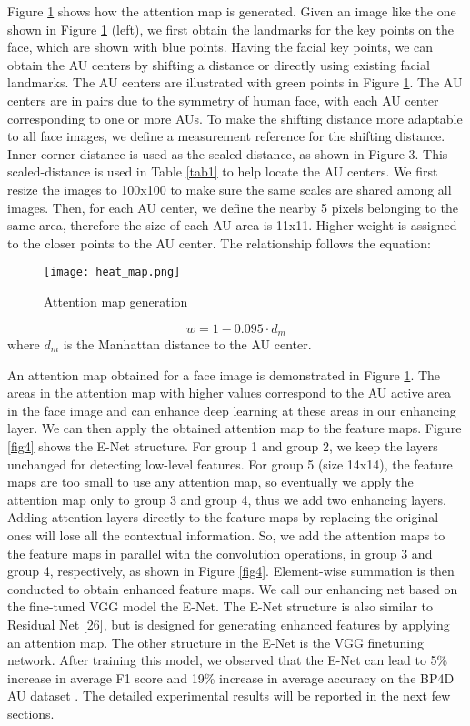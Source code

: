 \documentclass[a4paper, 10pt, conference]{ieeeconf}      %
\begin{document}
Figure \ref{fig3} shows how the attention map is generated. Given an image like the one shown in Figure \ref{fig3} (left), we first obtain the landmarks for the key points on the face, which are shown with blue points. Having the facial key points, we can obtain the AU centers by shifting a distance or directly using existing facial landmarks. The AU centers are illustrated with green points in Figure \ref{fig3}. The AU centers are in pairs due to the symmetry of human face, with each AU center corresponding to one or more AUs. To make the shifting distance more adaptable to all face images, we define a measurement reference for the shifting distance. Inner corner distance is used as the scaled-distance, as shown in Figure 3. This scaled-distance is used in Table \ref{tab1} to help locate the AU centers. We first resize the images to 100x100 to make sure the same scales are shared among all images. Then, for each AU center, we define the nearby 5 pixels belonging to the same area, therefore the size of each AU area is 11x11. Higher weight is assigned to the closer points to the AU center. The relationship follows the equation:

 \begin{figure}[thpb]
      \centering
      \texttt{[image: heat\_map.png]}
      \caption{Attention map generation}
      \label{fig3}
   \end{figure}

\begin{equation}
w=1-0.095\cdot d_{m}
\end{equation}
where $d_{m}$ is the Manhattan distance to the AU center.

An attention map obtained for a face image is demonstrated in Figure \ref{fig3}. The areas in the attention map with higher values correspond to the AU active area in the face image and can enhance deep learning at these areas in our enhancing layer.
We can then apply the obtained attention map to the feature maps. Figure \ref{fig4} shows the E-Net structure. For group 1 and group 2, we keep the layers unchanged for detecting low-level features. For group 5 (size 14x14), the feature maps are too small to use any attention map, so eventually we apply the attention map only to group 3 and group 4, thus we add two enhancing layers. Adding attention layers directly to the feature maps by replacing the original ones will lose all the contextual information. So, we add the attention maps to the feature maps in parallel with the convolution operations, in group 3 and group 4, respectively, as shown in Figure \ref{fig4}. Element-wise summation is then conducted to obtain enhanced feature maps. We call our enhancing net based on the fine-tuned VGG model the E-Net. The E-Net structure is also similar to Residual Net [26], but is designed for generating enhanced features by applying an attention map.  The other structure in the E-Net is the VGG finetuning network. After training this model, we observed that the E-Net can lead to 5\% increase in average F1 score and 19\% increase in average accuracy on the BP4D AU dataset \cite{p27}. The detailed experimental results will be reported in the next few sections.
\end{document}
